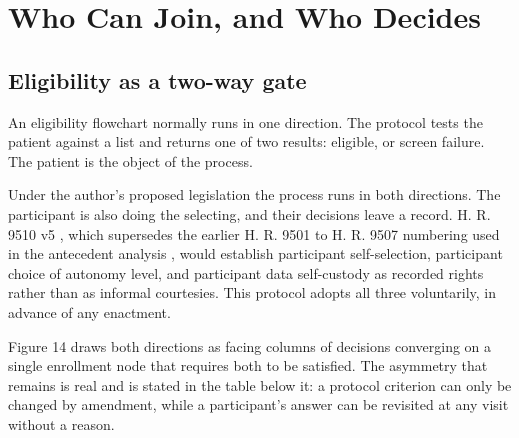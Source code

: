 \section{Who Can Join, and Who Decides}

\subsection{Eligibility as a two-way gate}

An eligibility flowchart normally runs in one direction. The protocol tests the
patient against a list and returns one of two results: eligible, or screen
failure. The patient is the object of the process.

Under the author's proposed legislation the process runs in both directions. The
participant is also doing the selecting, and their decisions leave a record.
H. R. 9510 v5 \cite{hr9510billv5}, which supersedes the earlier H. R. 9501 to
H. R. 9507 numbering used in the antecedent analysis \cite{paibillprior}, would
establish participant self-selection, participant choice of autonomy level, and
participant data self-custody as recorded rights rather than as informal
courtesies. This protocol adopts all three voluntarily, in advance of any
enactment.

Figure 14 draws both directions as facing columns of decisions converging on a
single enrollment node that requires both to be satisfied. The asymmetry that
remains is real and is stated in the table below it: a protocol criterion can
only be changed by amendment, while a participant's answer can be revisited at
any visit without a reason.

